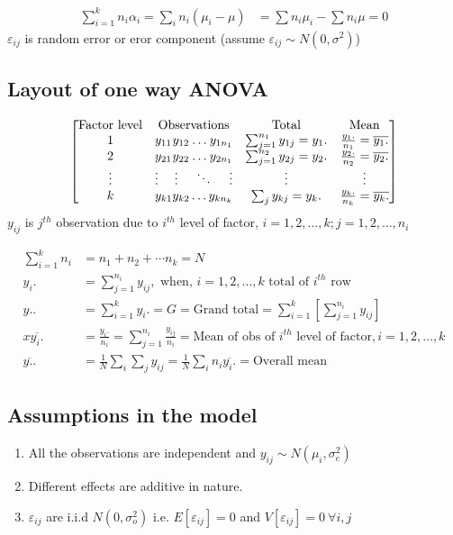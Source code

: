 \documentclass[oneside,11pt,pdftex]{book}%
\numberwithin{equation}{section}
\numberwithin{section}{chapter}
\numberwithin{equation}{chapter}
\begin{document}
 
 \begin{align*}
  \sum_{i=1}^k n_i \alpha_i = \sum_{i} n_i (\mu_i-\mu) &= \sum n_i\mu_i - \sum n_i\mu = 0
 \end{align*}
 $ \varepsilon_{ij}$ is random error or eror component (assume $ \varepsilon_{ij} \sim N(0, \sigma^2) $)

\subsection{Layout of one way ANOVA}
\[
\begin{bmatrix} 
	\text{Factor level} & \text{Observations} & \text{Total} & \text{Mean} \\
	1 & y_{11} \hfill y_{12} \hfill \dots \hfill y_{1n_1} & \sum_{j=1}^{n_1}y_{1j}=y_1. & \frac{y_1.}{n_1}=\overline{y_{1}.}\\
	2 & y_{21} \hfill y_{22} \hfill \dots \hfill y_{2n_1} & \sum_{j=1}^{n_2}y_{2j}=y_2. & \frac{y_2.}{n_2}=\overline{y_{2}.}\\
	\vdots & \vdots \hfill \vdots \hfill \ddots \hfill \vdots & \vdots & \vdots \\
	k & y_{k1} \hfill y_{k2} \hfill \dots \hfill y_{kn_{k}} & \sum_j y_{kj}=y_k. & \frac{y_k .}{n_k}=\overline{y_{k}.}
\end{bmatrix}
\]
$ y_{ij} $ is $ j^{th} $ observation due to $ i^{th} $ level of factor, $ i=1,2,\dots, k; j=1,2,\dots,n_i $

\begin{align*}
	\sum_{i=1}^k n_i&=n_1+n_2+\cdots n_k = N\\
	y_i.&= \sum_{j=1}^{n_i} y_{ij}, \text{ when, } i=1,2,\dots,k \text{ total of $i^{th}$ row}\\
	y..&= \sum_{i=1}^{k} y_i. = G = \text{Grand total}= \sum_{i=1}^k \left[ \sum_{j=1}^{n_i} y_{ij} \right]\\
	x \overline{y_i.}&= \frac{y_i.}{n_i}=\sum_{j=1}^{n_i}\frac{y_{ij}}{n_i}= \text{Mean of obs of $i^{th}$ level of factor}, i=1,2, \dots, k\\
	\overline{y..}&=\frac{1}{N}\sum_i \sum_j y_{ij}=\frac{1}{N} \sum_i n_i \overline{y_i.}=\text{Overall mean}
\end{align*}

\subsection{Assumptions in the model}
\begin{enumerate}
	\item All the observations are independent and $ y_{ij} \sim N(\mu_i, \sigma_e ^2) $
	\item Different effects are additive in nature.
	\item $ \varepsilon_{ij} $ are i.i.d $ N(0, \sigma_o^2) $ i.e. $ E[\varepsilon_{ij}] =0$ and $ V[\varepsilon_{ij}] =0\ \forall i, j$
\end{enumerate}
\end{document}
